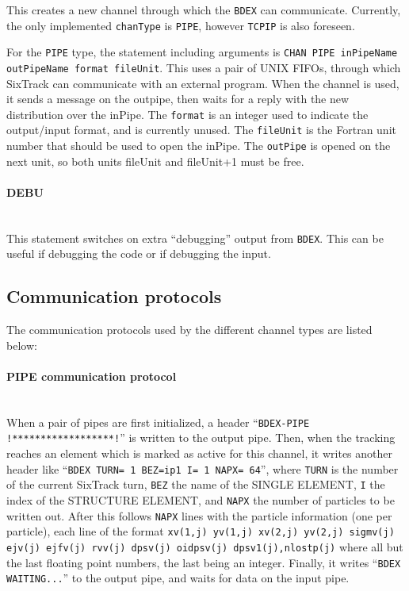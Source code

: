 This creates a new channel through which the \texttt{BDEX} can communicate.
Currently, the only implemented \texttt{chanType} is \texttt{PIPE}, however \texttt{TCPIP} is also foreseen.

For the \texttt{PIPE} type, the statement including arguments is \texttt{CHAN PIPE inPipeName outPipeName format fileUnit}.
This uses a pair of UNIX FIFOs, through which SixTrack can communicate with an external program.
When the channel is used, it sends a message on the outpipe, then waits for a reply with the new distribution over the inPipe.
The \texttt{format} is an integer used to indicate the output/input format, and is currently unused.
The \texttt{fileUnit} is the Fortran unit number that should be used to open the inPipe.
The \texttt{outPipe} is opened on the next unit, so both units fileUnit and fileUnit+1 must be free.

\paragraph{DEBU}~\\

This statement switches on extra ``debugging'' output from \texttt{BDEX}.
This can be useful if debugging the code or if debugging the input.

\subsection{Communication protocols}

The communication protocols used by the different channel types are listed below:

\paragraph{PIPE communication protocol}~\\

When a pair of pipes are first initialized, a header ``\texttt{BDEX-PIPE !******************!}'' is written to the output pipe.
Then, when the tracking reaches an element which is marked as active for this channel, it writes another header like ``\texttt{BDEX TURN= 1 BEZ=ip1 I= 1 NAPX= 64}'', where \texttt{TURN} is the number of the current SixTrack turn, \texttt{BEZ} the name of the SINGLE ELEMENT, \texttt{I} the index of the STRUCTURE ELEMENT, and \texttt{NAPX} the number of particles to be written out.
After this follows \texttt{NAPX} lines with the particle information (one per particle), each line of the format \texttt{xv(1,j) yv(1,j) xv(2,j) yv(2,j) sigmv(j) ejv(j) ejfv(j) rvv(j) dpsv(j) oidpsv(j) dpsv1(j),nlostp(j)} where all but the last floating point numbers, the last being an integer.
Finally, it writes ``\texttt{BDEX WAITING...}'' to the output pipe, and waits for data on the input pipe.

